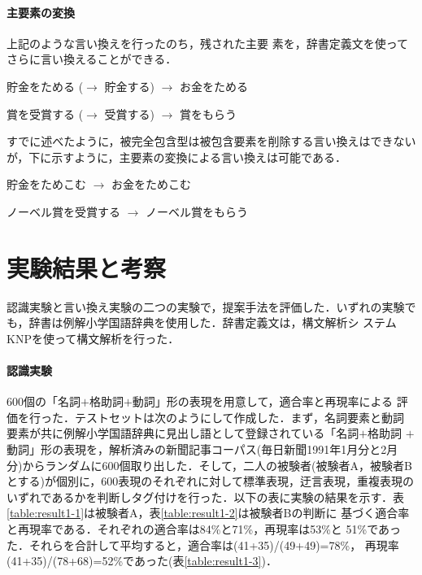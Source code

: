 \documentclass{nlp}
\begin{document}
\paragraph{主要素の変換} 上記のような言い換えを行ったのち，残された主要
素を，辞書定義文を使ってさらに言い換えることができる．
\begin{example}
 \item 貯金をためる ($\rightarrow$ 貯金する) $\rightarrow$ お金をためる
 \item 賞を受賞する ($\rightarrow$ 受賞する) $\rightarrow$ 賞をもらう
\end{example}
すでに述べたように，被完全包含型は被包含要素を削除する言い換えはできない
が，下に示すように，主要素の変換による言い換えは可能である．
\begin{example}
 \item 貯金をためこむ       $\rightarrow$ お金をためこむ
 \item ノーベル賞を受賞する $\rightarrow$ ノーベル賞をもらう
\end{example}


      
\section{実験結果と考察}
認識実験と言い換え実験の二つの実験で，提案手法を評価した．いずれの実験で
も，辞書は例解小学国語辞典\cite{RSK}を使用した．辞書定義文は，構文解析シ
ステムKNP\cite{Kurohashi1994}を使って構文解析を行った．

\paragraph{認識実験}
600個の「名詞$+$格助詞$+$動詞」形の表現を用意して，適合率と再現率による
評価を行った．テストセットは次のようにして作成した．まず，名詞要素と動詞
要素が共に例解小学国語辞典に見出し語として登録されている「名詞$+$格助詞
$+$動詞」形の表現を，解析済みの新聞記事コーパス(毎日新聞1991年1月分と2月
分)からランダムに600個取り出した．そして，二人の被験者(被験者A，被験者B
とする)が個別に，600表現のそれぞれに対して標準表現，迂言表現，重複表現の
いずれであるかを判断しタグ付けを行った．以下の表に実験の結果を示す．表
\ref{table:result1-1}は被験者A，表\ref{table:result1-2}は被験者Bの判断に
基づく適合率と再現率である．それぞれの適合率は84\%と71\%，再現率は53\%と
51\%であった．それらを合計して平均すると，適合率は(41+35)/(49+49)=78\%，
再現率(41+35)/(78+68)=52\%であった(表\ref{table:result1-3})．
\end{document}
